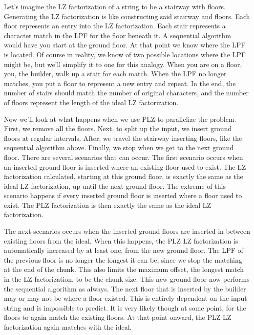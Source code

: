 Let's imagine the LZ factorization of a string to be a stairway with floors.
Generating the LZ factorization is like constructing said stairway and floors.
Each floor represents an entry into the LZ factorization.
Each stair represents a character match in the LPF for the floor beneath it.
A sequential algorithm would have you start at the ground floor.
At that point we know where the LPF is located.
Of course in reality, we know of two possible locations where the LPF might be, but we'll simplify it to one for this analogy.
When you are on a floor, you, the builder, walk up a stair for each match.
When the LPF no longer matches, you put a floor to represent a new entry and repeat.
In the end, the number of stairs should match the number of original characters, and the number of floors represent the length of the ideal LZ factorization.

Now we'll look at what happens when we use PLZ to parallelize the problem.
First, we remove all the floors.
Next, to split up the input, we insert ground floors at regular intervals.
After, we travel the stairway inserting floors, like the sequential algorithm above.
Finally, we stop when we get to the next ground floor.
There are several scenarios that can occur.
The first scenario occurs when an inserted ground floor is inserted where an existing floor used to exist.
The LZ factorization calculated, starting at this ground floor, is exactly the same as the ideal LZ factorization, up until the next ground floor.
The extreme of this scenario happens if every inserted ground floor is inserted where a floor used to exist.
The PLZ factorization is then exactly the same as the ideal LZ factorization.

The next scenarios occurs when the inserted ground floors are inserted in between existing floors from the ideal.
When this happens, the PLZ LZ factorization is automatically increased by at least one, from the new ground floor.
The LPF of the previous floor is no longer the longest it can be, since we stop the matching at the end of the chunk.
This also limits the maximum offset, the longest match in the LZ factorization, to be the chunk size.
This new ground floor now performs the sequential algorithm as always.
The next floor that is inserted by the builder may or may not be where a floor existed.
This is entirely dependent on the input string and is impossible to predict.
It is very likely though at some point, for the floors to again match the existing floors.
At that point onward, the PLZ LZ factorization again matches with the ideal.

